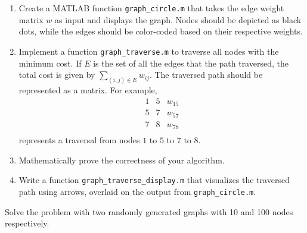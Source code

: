 \documentclass[10pt]{article} %
\begin{document}
\begin{enumerate}


\item Create a MATLAB function \texttt{graph\_circle.m} that takes the edge weight matrix \( w \) as input and displays the graph. Nodes should be depicted as black dots, while the edges should be color-coded based on their respective weights.

\item Implement a function \texttt{graph\_traverse.m} to traverse all nodes with the minimum cost. 
If $E$ is the set of all the edges that the path traversed, the total cost is given by $\sum_{(i,j) \in E} w_{ij}$.
The traversed path should be represented as a matrix. For example,
\[
\begin{array}{ccc}
1 & 5 & w_{15} \\
5 & 7 & w_{57} \\
7 & 8 & w_{78} \\
\end{array}
\]
represents a traversal from nodes \( 1 \) to \( 5 \) to \( 7 \) to \( 8 \).

\item Mathematically prove the correctness of your algorithm. 

\item Write a function \texttt{graph\_traverse\_display.m} that visualizes the traversed path using arrows, overlaid on the output from \texttt{graph\_circle.m}.
\end{enumerate}

Solve the problem with two randomly generated graphs with 10 and 100 nodes respectively.



% 


\end{document}
